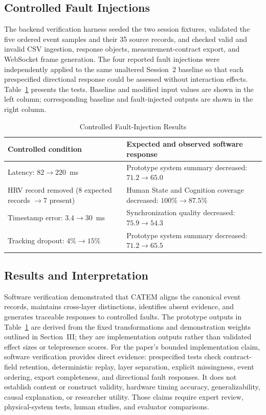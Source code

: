 \documentclass[letterpaper,10pt,conference]{ieeeconf}
\begin{document}
\subsection{Controlled Fault Injections}

The backend verification harness seeded the two session fixtures, validated the five ordered event samples and their 35 source records, and checked valid and invalid CSV ingestion, response objects, measurement-contract export, and WebSocket frame generation. The four reported fault injections were independently applied to the same unaltered Session~2 baseline so that each prespecified directional response could be assessed without interaction effects. Table~\ref{tab:tests} presents the tests. Baseline and modified input values are shown in the left column; corresponding baseline and fault-injected outputs are shown in the right column.

\begin{table}[t]
\caption{Controlled Fault-Injection Results}
\label{tab:tests}
\centering
\begin{tabular}{@{}>{\raggedright\arraybackslash}p{}>{\raggedright\arraybackslash}p{}@{}}
\toprule
\textbf{Controlled condition} & \textbf{Expected and observed software response}\\
\midrule
Latency: $82\rightarrow220$~ms & Prototype system summary decreased: $71.2\rightarrow65.0$\\
HRV record removed ($8$ expected records $\rightarrow 7$ present) & Human State and Cognition coverage decreased: $100\%\rightarrow87.5\%$\\
Timestamp error: $3.4\rightarrow30$~ms & Synchronization quality decreased: $75.9\rightarrow54.3$\\
Tracking dropout: $4\%\rightarrow15\%$ & Prototype system summary decreased: $71.2\rightarrow65.5$\\
\bottomrule
\end{tabular}
\end{table}

\subsection{Results and Interpretation}

Software verification demonstrated that CATEM aligns the canonical event records, maintains cross-layer distinctions, identifies absent evidence, and generates traceable responses to controlled faults. The prototype outputs in Table~\ref{tab:tests} are derived from the fixed transformations and demonstration weights outlined in Section~III; they are implementation outputs rather than validated effect sizes or telepresence scores. For the paper's bounded implementation claim, software verification provides direct evidence: prespecified tests check contract-field retention, deterministic replay, layer separation, explicit missingness, event ordering, export completeness, and directional fault responses. It does not establish content or construct validity, hardware timing accuracy, generalizability, causal explanation, or researcher utility. Those claims require expert review, physical-system tests, human studies, and evaluator comparisons.
\end{document}
